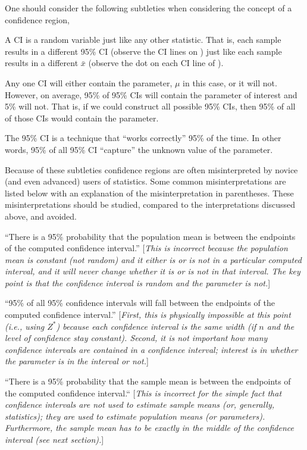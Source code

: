 \documentclass[10pt,openany]{book}\usepackage[]{graphicx}\usepackage[]{color}
\begin{document}
\begin{minipage}{\textwidth}
One should consider the following subtleties when considering the concept of a confidence region,
\begin{Itemize}
  \item A CI is a random variable just like any other statistic. That is, each sample results in a different 95\% CI (observe the CI lines on ) just like each sample results in a different $\bar{x}$ (observe the dot on each CI line of ).
  \item Any one CI will either contain the parameter, $\mu$ in this case, or it will not.  However, on average, 95\% of 95\% CIs will contain the parameter of interest and 5\% will not.  That is, if we could construct all possible 95\% CIs, then 95\% of all of those CIs would contain the parameter.
  \item The 95\% CI is a technique that ``works correctly'' 95\% of the time.  In other words, 95\% of all 95\% CI ``capture'' the unknown value of the parameter.
\end{Itemize}
\end{minipage}

Because of these subtleties confidence regions are often misinterpreted by novice (and even advanced) users of statistics.  Some common misinterpretations are listed below with an explanation of the misinterpretation in parentheses.  These misinterpretations should be studied, compared to the interpretations discussed above, and avoided.
\begin{Enumerate}
  \item ``There is a 95\% probability that the population mean is between the endpoints of the computed confidence interval.'' [\textit{This is incorrect because the population mean is constant (not random) and it either is or is not in a particular computed interval, and it will never change whether it is or is not in that interval.  The key point is that the confidence interval is random and the parameter is not.}]
  \item ``95\% of all 95\% confidence intervals will fall between the endpoints of the computed confidence interval.'' [\textit{First, this is physically impossible at this point (i.e., using $Z^{*}$) because each confidence interval is the same width (if $n$ and the level of confidence stay constant).  Second, it is not important how many confidence intervals are contained in a confidence interval; interest is in whether the parameter is in the interval or not.}]
  \item ``There is a 95\% probability that the sample mean is between the endpoints of the computed confidence interval.`` [\textit{This is incorrect for the simple fact that confidence intervals are not used to estimate sample means (or, generally, statistics); they are used to estimate population means (or parameters).  Furthermore, the sample mean has to be exactly in the middle of the confidence interval (see next section).}]
\end{Enumerate}
\end{document}
